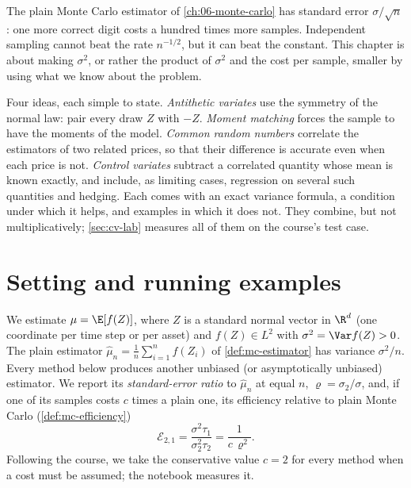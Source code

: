 \providecommand{\Corr}{\operatorname{Corr}}

The plain Monte Carlo estimator of \cref{ch:06-monte-carlo} has standard error
$\sigma/\sqrt n$: one more correct digit costs a hundred times more samples. Independent
sampling cannot beat the rate $n^{-1/2}$, but it can beat the constant. This chapter is
about making $\sigma^2$, or rather the product of $\sigma^2$ and the cost per sample,
smaller by using what we know about the problem.

Four ideas, each simple to state. \emph{Antithetic variates} use the symmetry of the
normal law: pair every draw $Z$ with $-Z$. \emph{Moment matching} forces the sample to
have the moments of the model. \emph{Common random numbers} correlate the estimators of
two related prices, so that their difference is accurate even when each price is not.
\emph{Control variates} subtract a correlated quantity whose mean is known exactly, and
include, as limiting cases, regression on several such quantities and hedging. Each comes
with an exact variance formula, a condition under which it helps, and examples in which it
does not. They combine, but not multiplicatively; \cref{sec:cv-lab} measures all of them
on the course's test case.

\section{Setting and running examples}\label{sec:cv-setting}

We estimate $\mu=\E[f(Z)]$, where $Z$ is a standard normal vector in $\R^d$ (one
coordinate per time step or per asset) and $f(Z)\in L^2$ with $\sigma^2=\Var f(Z)>0$. The
plain estimator $\hat\mu_n=\frac1n\sum_{i=1}^nf(Z_i)$ of \cref{def:mc-estimator} has
variance $\sigma^2/n$. Every method below produces another unbiased (or asymptotically
unbiased) estimator. We report its \emph{standard-error ratio} to $\hat\mu_n$ at equal
$n$, $\varrho=\sigma_2/\sigma$, and, if one of its samples costs $c$ times a plain one, its
efficiency relative to plain Monte Carlo (\cref{def:mc-efficiency})
\begin{equation}\label{eq:cv-efficiency}
  \mathcal E_{2,1}=\frac{\sigma^2\tau_1}{\sigma_2^2\tau_2}=\frac{1}{c\,\varrho^2}.
\end{equation}
Following the course, we take the conservative value $c=2$ for every method when a cost
must be assumed; the notebook measures it.

